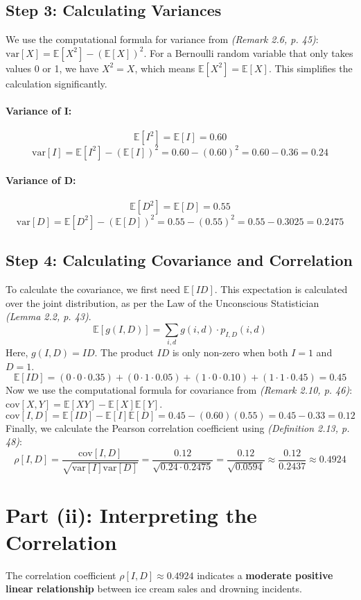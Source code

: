 \documentclass[11pt,a4paper]{article}
\newcommand{\scriptcite}[2]{\textit{(#1, p. #2)}}
\newcommand{\E}{\mathbb{E}}
\newcommand{\var}{\text{var}}
\newcommand{\cov}{\text{cov}}
\begin{document}
\subsection{Step 3: Calculating Variances}
We use the computational formula for variance from \scriptcite{Remark 2.6}{45}: $\var[X] = \E[X^2] - (\E[X])^2$.
For a Bernoulli random variable that only takes values 0 or 1, we have $X^2 = X$, which means $\E[X^2] = \E[X]$. This simplifies the calculation significantly.

\paragraph{Variance of I:}
\[ \E[I^2] = \E[I] = 0.60 \]
\[ \var[I] = \E[I^2] - (\E[I])^2 = 0.60 - (0.60)^2 = 0.60 - 0.36 = \mathbf{0.24} \]

\paragraph{Variance of D:}
\[ \E[D^2] = \E[D] = 0.55 \]
\[ \var[D] = \E[D^2] - (\E[D])^2 = 0.55 - (0.55)^2 = 0.55 - 0.3025 = \mathbf{0.2475} \]

\subsection{Step 4: Calculating Covariance and Correlation}
To calculate the covariance, we first need $\E[ID]$. This expectation is calculated over the joint distribution, as per the Law of the Unconscious Statistician \scriptcite{Lemma 2.2}{43}.
\[ \E[g(I,D)] = \sum_{i,d} g(i,d) \cdot p_{I,D}(i,d) \]
Here, $g(I,D) = ID$. The product $ID$ is only non-zero when both $I=1$ and $D=1$.
\[ \E[ID] = (0 \cdot 0 \cdot 0.35) + (0 \cdot 1 \cdot 0.05) + (1 \cdot 0 \cdot 0.10) + (1 \cdot 1 \cdot 0.45) = 0.45 \]
Now we use the computational formula for covariance from \scriptcite{Remark 2.10}{46}: $\cov[X,Y] = \E[XY] - \E[X]\E[Y]$.
\[ \cov[I,D] = \E[ID] - \E[I]\E[D] = 0.45 - (0.60)(0.55) = 0.45 - 0.33 = \mathbf{0.12} \]
Finally, we calculate the Pearson correlation coefficient using \scriptcite{Definition 2.13}{48}:
\[ \rho[I,D] = \frac{\cov[I,D]}{\sqrt{\var[I]\var[D]}} = \frac{0.12}{\sqrt{0.24 \cdot 0.2475}} = \frac{0.12}{\sqrt{0.0594}} \approx \frac{0.12}{0.2437} \approx \mathbf{0.4924} \]

\section{Part (ii): Interpreting the Correlation}
The correlation coefficient $\rho[I,D] \approx 0.4924$ indicates a \textbf{moderate positive linear relationship} between ice cream sales and drowning incidents.
\end{document}

